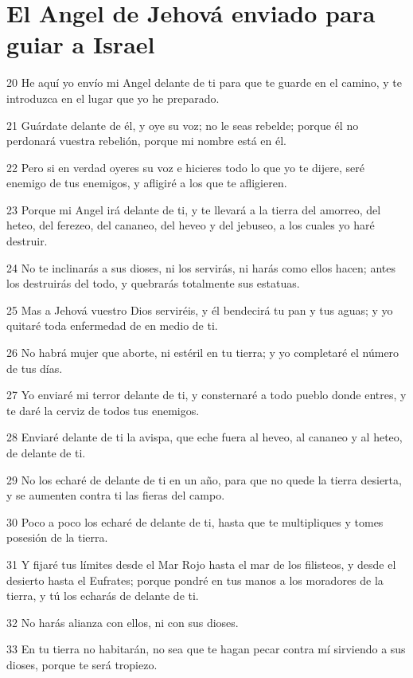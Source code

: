 \section*{El Angel de Jehová enviado para guiar a Israel}

\par 20 He aquí yo envío mi Angel delante de ti para que te guarde en el camino, y te introduzca en el lugar que yo he preparado.
\par 21 Guárdate delante de él, y oye su voz; no le seas rebelde; porque él no perdonará vuestra rebelión, porque mi nombre está en él.
\par 22 Pero si en verdad oyeres su voz e hicieres todo lo que yo te dijere, seré enemigo de tus enemigos, y afligiré a los que te afligieren.
\par 23 Porque mi Angel irá delante de ti, y te llevará a la tierra del amorreo, del heteo, del ferezeo, del cananeo, del heveo y del jebuseo, a los cuales yo haré destruir.
\par 24 No te inclinarás a sus dioses, ni los servirás, ni harás como ellos hacen; antes los destruirás del todo, y quebrarás totalmente sus estatuas.
\par 25 Mas a Jehová vuestro Dios serviréis, y él bendecirá tu pan y tus aguas; y yo quitaré toda enfermedad de en medio de ti.
\par 26 No habrá mujer que aborte, ni estéril en tu tierra; y yo completaré el número de tus días.
\par 27 Yo enviaré mi terror delante de ti, y consternaré a todo pueblo donde entres, y te daré la cerviz de todos tus enemigos.
\par 28 Enviaré delante de ti la avispa, que eche fuera al heveo, al cananeo y al heteo, de delante de ti.
\par 29 No los echaré de delante de ti en un año, para que no quede la tierra desierta, y se aumenten contra ti las fieras del campo.
\par 30 Poco a poco los echaré de delante de ti, hasta que te multipliques y tomes posesión de la tierra.
\par 31 Y fijaré tus límites desde el Mar Rojo hasta el mar de los filisteos, y desde el desierto hasta el Eufrates; porque pondré en tus manos a los moradores de la tierra, y tú los echarás de delante de ti.
\par 32 No harás alianza con ellos, ni con sus dioses.
\par 33 En tu tierra no habitarán, no sea que te hagan pecar contra mí sirviendo a sus dioses, porque te será tropiezo.

